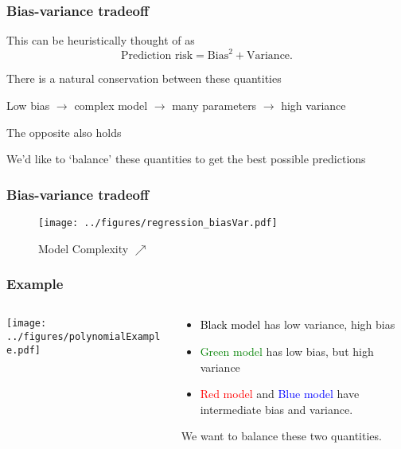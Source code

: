 \documentclass{beamer}
\begin{document}
\begin{frame}
\frametitle{Bias-variance tradeoff}
This can be heuristically thought of as
\[
\textrm{Prediction risk} = \textrm{Bias}^2 + \textrm{Variance}.
\]

There is a natural conservation between these quantities

\vsp
Low bias $\rightarrow$ complex model $\rightarrow$ many parameters $\rightarrow$ high variance

\vsp
The opposite also holds


\vsp
We'd like to `balance' these quantities to get the best possible predictions
\end{frame}

\begin{frame}
\frametitle{Bias-variance tradeoff}
 \begin{figure}
 \centering
 \texttt{[image: ../figures/regression\_biasVar.pdf]}   \\
  \caption*{Model Complexity $\nearrow$}
  \end{figure}
\end{frame}


\begin{frame}
\frametitle{Example}
\begin{columns}[T]
    \begin{column}{.55\textwidth}
  \texttt{[image: ../figures/polynomialExample.pdf]}
  \end{column}
    \begin{column}{.45\textwidth}
 \begin{itemize}
 \item \textcolor{black}{Black model} has low variance, high bias
 \item \textcolor{green}{Green model} has low bias, but high variance
 \item \textcolor{red}{Red model} and \textcolor{blue}{Blue model} have intermediate
 bias and variance.
 \end{itemize}
\vsp

We want to balance these two quantities.
    \end{column}
  \end{columns}
\end{frame}
\end{document}

